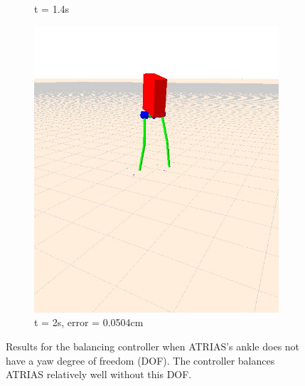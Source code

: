 \documentclass[letterpaper, 10 pt, conference]{ieeeconf}  %
\begin{document}
\begin{figure}[tbp]
\begin{subfigure}[b]{0.3\textwidth}
    \caption{t = 1.4s }
    \label{fig:balanceNoYaw2}
  \end{subfigure}\hfill
  \begin{subfigure}[b]{0.3\textwidth}
    \centering
    \includegraphics[width=\textwidth] {figures/balanceNoYaw3.jpg} 
    \caption{t = 2s, error = 0.0504cm}
    \label{fig:balanceNoYaw3}
  \end{subfigure}
  \caption{Results for the balancing controller when ATRIAS's ankle does not have a yaw degree of freedom (DOF). The controller balances ATRIAS relatively well without this DOF.}
  \label{fig:balancing}
\end{figure}
\end{document}
